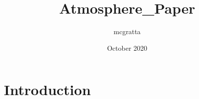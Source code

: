 \documentclass{article}
\title{Atmosphere_Paper}
\author{mcgratta }
\date{October 2020}
\begin{document}
\maketitle

\section{Introduction}
\end{document}
